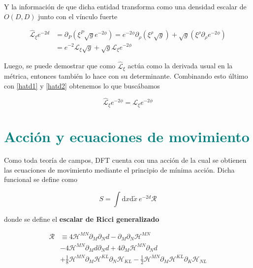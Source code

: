 \documentclass{article}
\numberwithin{equation}{section}
\begin{document}
Y la información de que dicha entidad transforma como una densidad escalar de $ O(D,D) $ junto con el vínculo fuerte

\begin{equation}\label{hatd2}
\begin{aligned}
\hat{\mathcal{L}}_{\xi} e^{-2d} &= \partial_P \left( \xi^P\sqrt{g}e^{-2\phi}\right) = e^{-2\phi} \partial_{\rho} \left(\xi^{\rho}\sqrt{g}\right) + \sqrt{g} \left(\xi^{\rho}\partial_{\rho}e^{-2\phi}\right)\\
&= e^{-2} \mathcal{L}_{\xi}\sqrt{g} + \sqrt{g} \mathcal{L}_{\xi}e^{-2\phi}
\end{aligned}
\end{equation}

Luego, se puede demostrar que como $ \hat{\mathcal{L}}_{\xi} $ actúa como la derivada usual en la métrica, entonces también lo hace con su determinante. Combinando esto último con \ref{hatd1} y \ref{hatd2} obtenemos lo que buscábamos

\begin{equation}\label{key}
\hat{\mathcal{L}}_{\xi} e^{-2\phi} = \mathcal{L}_{\xi} e^{-2\phi}
\end{equation}

\section{\textcolor{teal}{Acción y ecuaciones de movimiento}}

Como toda teoría de campos, DFT cuenta con una acción de la cual se obtienen las ecuaciones de movimiento mediante el principio de mínima acción. Dicha funcional se define como

\begin{equation}\label{S}
S = \int \mathrm{d}x\mathrm{d}\widetilde{x} \ e^{-2d} \mathcal{R}
\end{equation}

donde se define el \textbf{escalar de Ricci generalizado}

\begin{equation}\label{Rhat}
\begin{aligned}
\mathcal{R} &\equiv 4\mathcal{H}^{MN}\partial_M\partial_N d - \partial_M\partial_N\mathcal{H}^{MN}\\
& - 4\mathcal{H}^{MN}\partial_M d\partial_N d + 4\partial_M\mathcal{H}^{MN}\partial_N d\\
& + \frac{1}{8} \mathcal{H}^{MN}\partial_M \mathcal{H}^{KL}\partial_N \mathcal{H}_{KL} - \frac{1}{2} \mathcal{H}^{MN}\partial_M \mathcal{H}^{KL}\partial_K \mathcal{H}_{NL}
\end{aligned}
\end{equation} 
\end{document}
